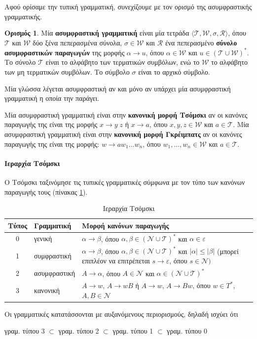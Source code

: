 \documentclass [a4paper,11pt] {book}
\theoremstyle{definition}
\theoremstyle{definition}
\newtheorem{definition}[theorem]{Ορισμός}
\begin{document}
Αφού ορίσαμε την τυπική γραμματική, συνεχίζουμε με τον ορισμό της ασυμφραστικής γραμματικής.

\begin{definition}
\label{contextFreeGrammar}
Μία \textbf{ασυμφραστική γραμματική} είναι μία τετράδα $\langle \mathcal{T},\mathcal{W},\sigma,\mathcal{R} \rangle$, όπου $\mathcal{T}$ και $\mathcal{W}$ δύο ξένα πεπερασμένα σύνολα, $\sigma \in \mathcal{W}$ και $\mathcal{R}$ ένα πεπερασμένο \textbf{σύνολο ασυμφραστικών παραγωγών} της μορφής $\alpha \to u$, όπου $\alpha \in \mathcal{W}$ και $u \in (\mathcal{T} \cup \mathcal{W})^{*}$. Το σύνολο $\mathcal{T}$ είναι το αλφάβητο των τερματικών συμβόλων, ενώ το $\mathcal{W}$ το αλφάβητο των μη τερματικών συμβόλων. Το σύμβολο $\sigma$ είναι το αρχικό σύμβολο.
\end{definition}
Μία γλώσσα λέγεται ασυμφραστική αν και μόνο αν υπάρχει μία ασυμφραστική γραμματική η οποία την παράγει.

Μία ασυμφραστική γραμματική είναι στην \textbf{κανονική μορφή Τσόμσκι} αν οι κανόνες παραγωγής της είναι της μορφής $x\to y \; z$ ή $x\to a$, όπου $x,y,z\in \mathcal{W}$ και $a\in\mathcal{T}$. Μία ασυμφραστική γραμματική είναι στην \textbf{κανονική μορφή Γκρέιμπατς} αν οι κανόνες παραγωγής της είναι της μορφής: $w\to a w_{1}...w_{n}$, όπου $w_{1},...,w_{n}\in\mathcal{W}$ και $a\in \mathcal{T}$.

\paragraph{Ιεραρχία Τσόμσκι}
Ο Τσόμσκι ταξινόμησε τις τυπικές γραμματικές σύμφωνα με τον τύπο των κανόνων παραγωγής τους (πίνακας \ref{chomskyHierarchy}).
\begin{table}[H]
\centering
\begin{tabular}{cl p{7cm}}
\textbf{Τύπος} & \textbf{Γραμματική} & \textbf{Μορφή κανόνων παραγωγής} \\ \hline
0 & γενική & $\alpha\to\beta$, όπου $\alpha,\beta\in (\mathcal{N}\cup\mathcal{T})^{*}$ και $\alpha\in\varepsilon$ \\
1 & συμφραστική & $\alpha\to\beta$, όπου $\alpha,\beta\in (\mathcal{N}\cup\mathcal{T})^{*}$ και $\left | \alpha \right | \leq \left | \beta \right |$ (μπορεί επιπλέον να επιτρέπεται $s\to\varepsilon$, όπου $s\in \mathcal{N})$
\\
2 & ασυμφραστική & $A\to\alpha$, όπου $A\in\mathcal{N}$ και $\alpha\in (\mathcal{N}\cup\mathcal{T})^{*}$ \\
3 & κανονική & $A\to w$, $A\to wB$ ή $A\to w$, $A\to Bw$, όπου $w\in T^{*}$, $A,B\in\mathcal{N}$
\end{tabular}
\caption{Ιεραρχία Τσόμσκι}
\label{chomskyHierarchy}
\end{table}
Οι γραμματικές κατατάσσονται με αυξανόμενους περιορισμούς, δηλαδή ισχύει ότι
\begin{center}
γραμ. τύπου 3 $\subset$ γραμ. τύπου 2 $\subset$ γραμ. τύπου 1 $\subset$ γραμ. τύπου 0
\end{center}
\end{document}
